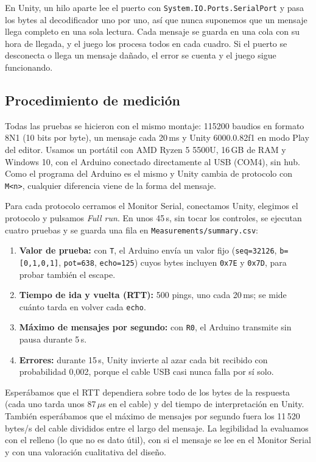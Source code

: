 \documentclass[journal]{IEEEtran}
\begin{document}
En Unity, un hilo aparte lee el puerto con \texttt{System.IO.Ports.SerialPort} y pasa los bytes al decodificador uno por uno, así que nunca suponemos que un mensaje llega completo en una sola lectura. Cada mensaje se guarda en una cola con su hora de llegada, y el juego los procesa todos en cada cuadro. Si el puerto se desconecta o llega un mensaje dañado, el error se cuenta y el juego sigue funcionando.

\subsection{Procedimiento de medición}
Todas las pruebas se hicieron con el mismo montaje: 115200 baudios en formato 8N1 (10 bits por byte), un mensaje cada 20\,ms y Unity 6000.0.82f1 en modo Play del editor. Usamos un portátil con AMD Ryzen 5 5500U, 16\,GB de RAM y Windows 10, con el Arduino conectado directamente al USB (COM4), sin hub. Como el programa del Arduino es el mismo y Unity cambia de protocolo con \texttt{M<n>}, cualquier diferencia viene de la forma del mensaje.

Para cada protocolo cerramos el Monitor Serial, conectamos Unity, elegimos el protocolo y pulsamos \emph{Full run}. En unos 45\,s, sin tocar los controles, se ejecutan cuatro pruebas y se guarda una fila en \texttt{Measurements/summary.csv}:
\begin{enumerate}
    \item \textbf{Valor de prueba:} con \texttt{T}, el Arduino envía un valor fijo (\texttt{seq=32126}, \texttt{b=[0,1,0,1]}, \texttt{pot=638}, \texttt{echo=125}) cuyos bytes incluyen \texttt{0x7E} y \texttt{0x7D}, para probar también el escape.
    \item \textbf{Tiempo de ida y vuelta (RTT):} 500 pings, uno cada 20\,ms; se mide cuánto tarda en volver cada \texttt{echo}.
    \item \textbf{Máximo de mensajes por segundo:} con \texttt{R0}, el Arduino transmite sin pausa durante 5\,s.
    \item \textbf{Errores:} durante 15\,s, Unity invierte al azar cada bit recibido con probabilidad 0,002, porque el cable USB casi nunca falla por sí solo.
\end{enumerate}

Esperábamos que el RTT dependiera sobre todo de los bytes de la respuesta (cada uno tarda unos 87\,$\mu$s en el cable) y del tiempo de interpretación en Unity. También esperábamos que el máximo de mensajes por segundo fuera los 11\,520 bytes/s del cable divididos entre el largo del mensaje. La legibilidad la evaluamos con el relleno (lo que no es dato útil), con si el mensaje se lee en el Monitor Serial y con una valoración cualitativa del diseño.
\end{document}
